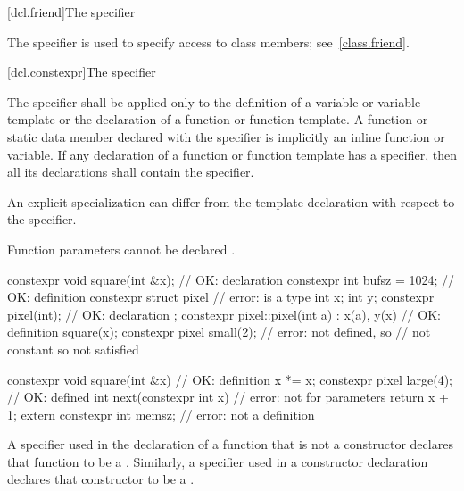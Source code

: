 [dcl.friend]{The  specifier}%

\pnum
The  specifier is used to specify access to class members;
see~\ref{class.friend}.

[dcl.constexpr]{The  specifier}%

\pnum
The  specifier shall be applied only to the definition of
a variable or variable template or
the declaration of a
function or function template.
A function or static data member declared with the 
specifier is implicitly an inline function or variable.
If any declaration of a function or function template has
a  specifier,
then all its declarations shall contain the  specifier. \begin{note} An
explicit specialization can differ from the template declaration with respect to the
 specifier. \end{note}
\begin{note}
Function parameters cannot be declared .\end{note}
\begin{example}
\begin{codeblock}
constexpr void square(int &x);  // OK: declaration
constexpr int bufsz = 1024;     // OK: definition
constexpr struct pixel {        // error:  is a type
  int x;
  int y;
  constexpr pixel(int);         // OK: declaration
};
constexpr pixel::pixel(int a)
  : x(a), y(x)                  // OK: definition
  { square(x); }
constexpr pixel small(2);       // error:  not defined, so 
                                // not constant so  not satisfied

constexpr void square(int &x) { // OK: definition
  x *= x;
}
constexpr pixel large(4);       // OK:  defined
int next(constexpr int x) {     // error: not for parameters
     return x + 1;
}
extern constexpr int memsz;     // error: not a definition
\end{codeblock}
\end{example}

\pnum
A  specifier used in the declaration of a function that is not a
constructor declares that
function to be a . Similarly, a
 specifier used in
a constructor declaration declares that constructor to be a
.

